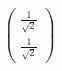 \documentclass[preview]{standalone}
\begin{document}
\begin{align*}
\begin{pmatrix} \frac{1}{\sqrt{2}} \\[6px] \frac{1}{\sqrt{2}} \end{pmatrix}
\end{align*}
\end{document}
